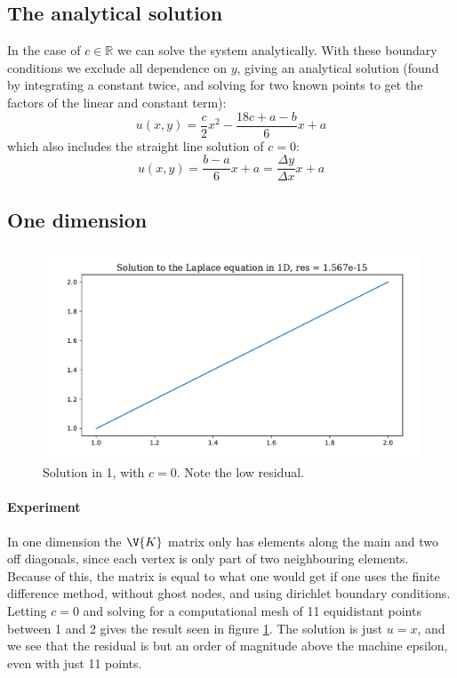 \documentclass[sigconf]{acmart}
\begin{document}
\subsection{The analytical solution}
In the case of $ c\in \mathbb{R} $ we can solve the system analytically. With these boundary conditions we exclude all dependence on $ y $, giving an analytical solution (found by integrating a constant twice, and solving for two known points to get the factors of the linear and constant term):
\begin{equation}\label{key}
	u(x, y) = \frac{c}{2}x^2 - \frac{18c + a - b}{6} x + a
\end{equation}
which also includes the straight line solution of $ c=0 $:
\begin{equation}\label{key}
	u(x,y) = \frac{b-a}{6} x + a = \frac{\Delta y}{\Delta x} x + a
\end{equation}

\subsection{One dimension}
\begin{figure}
	\includegraphics[width=\linewidth]{experiment1d.pdf}
	\caption{Solution in 1, with $ c=0 $. Note the low residual.}
	\label{fig:exp1D}
\end{figure}
\paragraph{Experiment}
In one dimension the $ \V{K} $ matrix only has elements along the main and two off diagonals, since each vertex is only part of two neighbouring elements. Because of this, the matrix is equal to what one would get if one uses the finite difference method, without ghost nodes, and using dirichlet boundary conditions. Letting $ c=0 $ and solving for a computational mesh of 11 equidistant points between 1 and 2 gives the result seen in figure \ref{fig:exp1D}. The solution is just $ u = x $, and we see that the residual is but an order of magnitude above the machine epsilon, even with just 11 points.
\end{document}
